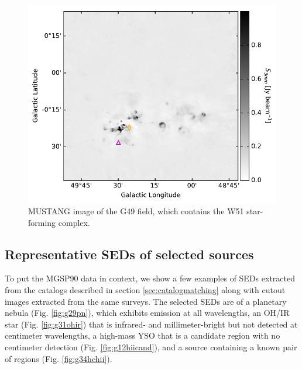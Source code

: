 \documentclass[twocolumn]{aastex62}
\def\todo#1{{\textcolor{red}{TODO: #1}}}
\begin{document}
\begin{figure}[htp]
\includegraphics[width=17cm]{figures/G49_overview_withcatalog.pdf}
\caption{MUSTANG image of the G49 field, which contains the W51 star-forming
complex.}
\label{fig:g49overview}
\end{figure}

\subsection{Representative SEDs of selected sources}
To put the MGSP90 data in context, we show a few examples of SEDs extracted
from the catalogs described in section \ref{sec:catalogmatching} along with
cutout images extracted from the same surveys.  The selected SEDs are of a
planetary nebula (Fig. \ref{fig:g29pn}), which exhibits emission at all
wavelengths, an OH/IR star (Fig. \ref{fig:g31ohir}) that is infrared- and
millimeter-bright but not detected at centimeter wavelengths, a high-mass
YSO that is a candidate \hchii region with no centimeter detection (Fig.
\ref{fig:g12hiicand}), and a source containing a known pair of \hchii regions
(Fig.  \ref{fig:g34hchii}).  

\end{document}
